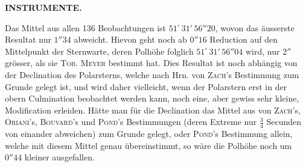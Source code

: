 \clearpage
\endgroup
\begingroup
\pagestyle{empty}
\newcommand{\GaussVIGathering}[2]{%
  \fancypagestyle{gaussVIGathering}{%
    \fancyhf{}%
    \renewcommand{\headrulewidth}{0pt}%
    \renewcommand{\footrulewidth}{0pt}%
    \fancyfoot[C]{\makebox[\textwidth][l]{%
      \hspace*{.025\textwidth}{\footnotesize\bfseries #1}\hfill
      {\normalsize\bfseries\textls[90]{#2}}\hspace*{.18\textwidth}}}%
  }%
  \thispagestyle{gaussVIGathering}%
}
\thispagestyle{empty}
\noindent{}%
\makebox[12mm][l]{}%
\parbox[t]{\dimexpr\linewidth-24mm\relax}{\centering\footnotesize\bfseries INSTRUMENTE.\par}%
\par\nobreak\medskip
\par\indent Das Mittel aus allen 136 Beobachtungen ist $51^\circ\,31'\,56''20$, wovon das äusserste Resultat nur $1''34$ abweicht. Hievon geht noch ab $0''16$ Reduction auf den Mittelpunkt der Sternwarte, deren Polhöhe folglich $51^\circ\,31'\,56''04$ wird, nur $2''$ grösser, als sie \textsc{Tob. Meyer} bestimmt hat. Dies Resultat ist noch abhängig von der Declination des Polarsterns, welche nach Hrn. von \textsc{Zach}'s Bestimmung zum Grunde gelegt ist, und wird daher vielleicht, wenn der Polarstern erst in der obern Culmination beobachtet werden kann, noch eine, aber gewiss sehr kleine, Modification erleiden. Hätte man für die Declination das Mittel aus von \textsc{Zach}'s, \textsc{Oriani}'s, \textsc{Bouvard}'s und \textsc{Pond}'s Bestimmungen (deren Extreme nur $\frac{3}{4}$ Secunden von einander abweichen) zum Grunde gelegt, oder \textsc{Pond}'s Bestimmung allein, welche mit diesem Mittel genau übereinstimmt, so wäre die Polhöhe noch um $0''44$ kleiner ausgefallen.

